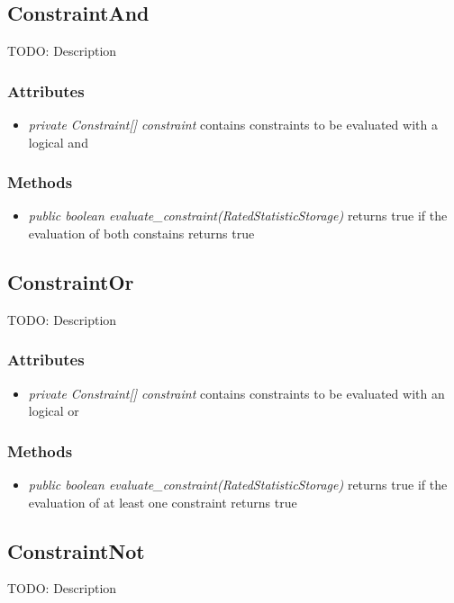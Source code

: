 \subsection{ConstraintAnd }
TODO: Description

\subsubsection{Attributes}
\begin{itemize}
	\item \textit{ private Constraint[] constraint }
	contains constraints to be evaluated with a logical and	
\end{itemize}
\subsubsection{Methods}
\begin{itemize}
	\item \textit{ public boolean evaluate\_constraint(RatedStatisticStorage) }
	returns true if the evaluation of both constains returns true
\end{itemize}


\subsection{ConstraintOr }
TODO: Description

\subsubsection{Attributes}
\begin{itemize}
	\item \textit{ private Constraint[] constraint }
	contains constraints to be evaluated with an logical or
\end{itemize}
\subsubsection{Methods}
\begin{itemize}
	\item \textit{ public boolean evaluate\_constraint(RatedStatisticStorage) }
	returns true if the evaluation of at least one constraint returns true
\end{itemize}


\subsection{ConstraintNot }
TODO: Description

